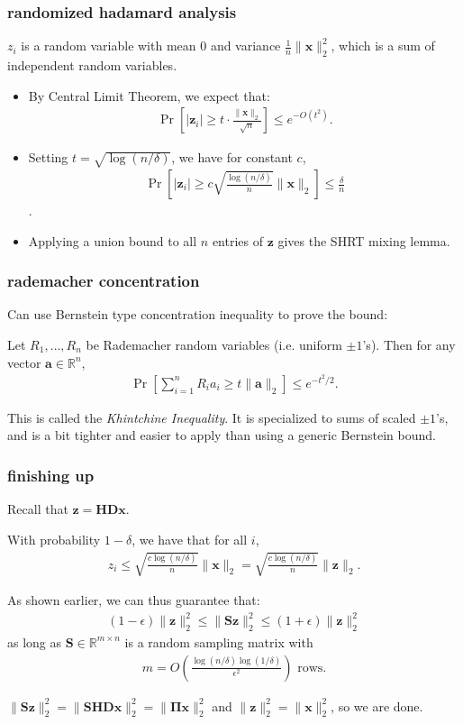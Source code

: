 \documentclass[compress]{beamer}
\newcommand{\bs}[1]{\boldsymbol{#1}}
\newcommand{\bv}[1]{\mathbf{#1}}
\newcommand{\R}{\mathbb{R}}
\begin{document}
\begin{frame}[t]
	\frametitle{randomized hadamard analysis}
	${z}_i$ is a random variable with mean $0$ and variance $\frac{1}{n}\|\bv{x}\|_2^2$, which is a sum of independent random variables. 
	\begin{itemize}
		\item By Central Limit Theorem, we expect that:
		\begin{align*}
			\Pr[|\bv{z}_i| \geq t\cdot \frac{\|\bv{x}\|_2}{\sqrt{n}}] \leq e^{-O(t^2)}. 
		\end{align*}
		\item Setting $t = \sqrt{\log(n/\delta)}$, we have for constant $c$, \begin{align*}\Pr\left[|\bv{z}_i| \geq c\sqrt{\frac{\log(n/\delta)}{n}}\|\bv{x}\|_2 \right] \leq \frac{\delta}{n}\end{align*}. 
		\item Applying a union bound to all $n$ entries of $\bv{z}$ gives the SHRT mixing lemma.
	\end{itemize}
\end{frame}


\begin{frame}[t]
	\frametitle{rademacher concentration}
	Can use Bernstein type concentration inequality to prove the bound:
	\begin{lemma}
		Let ${R}_1, \ldots, R_n$ be Rademacher random variables (i.e. uniform $\pm 1$'s). Then for any vector $\bv{a}\in \R^n$,
		\begin{align*}
		\Pr\left[\sum_{i=1}^n R_i a_i \geq t \|\bv{a}\|_2 \right] \leq e^{-t^2/2}.
		\end{align*}
	\end{lemma}
This is called the \emph{Khintchine Inequality}. It is specialized to sums of scaled $\pm 1$'s, and is a bit tighter and easier to apply than using a generic Bernstein bound.
\end{frame}

\begin{frame} 
	\frametitle{finishing up}
	Recall that $\bv{z} = \bv{H}\bv{D}\bv{x}$.
	
	With probability $1-\delta$, we have that for all $i$,
	\begin{align*}
		z_i \leq \sqrt{\frac{c\log(n/\delta)}{n}}\|\bv{x}\|_2 = \sqrt{\frac{c\log(n/\delta)}{n}}\|\bv{z}\|_2.
	\end{align*} 
	
	As shown earlier, we can thus guarantee that:
	\begin{align*}
		(1-\epsilon)\|\bv{z}\|_2^2 \leq \|\bv{S}\bv{z}\|_2^2 \leq (1+\epsilon)\|\bv{z}\|_2^2
	\end{align*}
as long as $\bv{S}\in \R^{m\times n}$ is a random sampling matrix with
	\begin{align*}
	m = O\left(\frac{\log(n/\delta)\log(1/\delta)}{\epsilon^2}\right) \text{ rows}. 
	\end{align*}
	
	$\|\bv{S}\bv{z}\|_2^2 = \|\bv{SHD}\bv{x}\|_2^2 = \|\bs{\Pi}\bv{x}\|_2^2$ and $\|\bv{z}\|_2^2 = \|\bv{x}\|_2^2$, so we are done. 
\end{frame}
\end{document}
